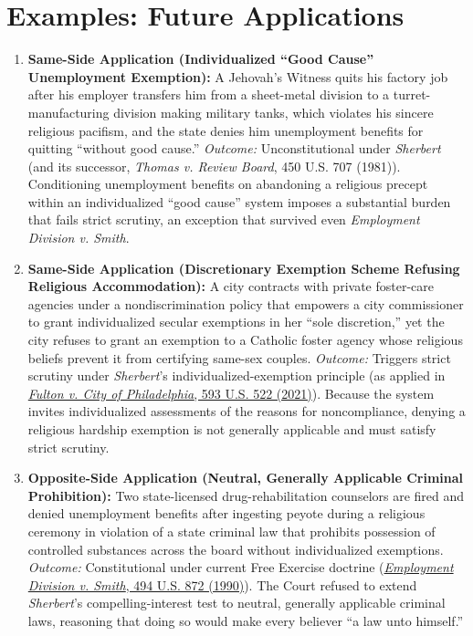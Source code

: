 \documentclass[12pt]{article}
\begin{document}
\section{Examples: Future Applications}

\begin{enumerate}
\item \textbf{Same-Side Application (Individualized ``Good Cause'' Unemployment Exemption):} A Jehovah's Witness quits his factory job after his employer transfers him from a sheet-metal division to a turret-manufacturing division making military tanks, which violates his sincere religious pacifism, and the state denies him unemployment benefits for quitting ``without good cause.'' \textit{Outcome:} Unconstitutional under \textit{Sherbert} (and its successor, \textit{Thomas v. Review Board}, 450 U.S. 707 (1981)). Conditioning unemployment benefits on abandoning a religious precept within an individualized ``good cause'' system imposes a substantial burden that fails strict scrutiny, an exception that survived even \textit{Employment Division v. Smith}.

\item \textbf{Same-Side Application (Discretionary Exemption Scheme Refusing Religious Accommodation):} A city contracts with private foster-care agencies under a nondiscrimination policy that empowers a city commissioner to grant individualized secular exemptions in her ``sole discretion,'' yet the city refuses to grant an exemption to a Catholic foster agency whose religious beliefs prevent it from certifying same-sex couples. \textit{Outcome:} Triggers strict scrutiny under \textit{Sherbert}'s individualized-exemption principle (as applied in \href{https://www.law.cornell.edu/supremecourt/text/19-123}{\textit{Fulton v. City of Philadelphia}, 593 U.S. 522 (2021)}). Because the system invites individualized assessments of the reasons for noncompliance, denying a religious hardship exemption is not generally applicable and must satisfy strict scrutiny.

\item \textbf{Opposite-Side Application (Neutral, Generally Applicable Criminal Prohibition):} Two state-licensed drug-rehabilitation counselors are fired and denied unemployment benefits after ingesting peyote during a religious ceremony in violation of a state criminal law that prohibits possession of controlled substances across the board without individualized exemptions. \textit{Outcome:} Constitutional under current Free Exercise doctrine (\href{https://fedsoc.org/case/employment-division-v-smith}{\textit{Employment Division v. Smith}, 494 U.S. 872 (1990)}). The Court refused to extend \textit{Sherbert}'s compelling-interest test to neutral, generally applicable criminal laws, reasoning that doing so would make every believer ``a law unto himself.''


\end{enumerate}
\end{document}

